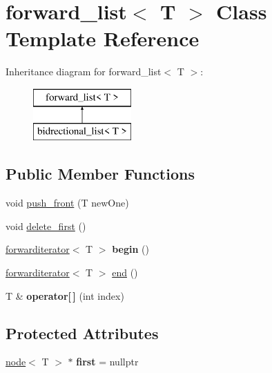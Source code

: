 \hypertarget{classforward__list}{}\section{forward\+\_\+list$<$ T $>$ Class Template Reference}
\label{classforward__list}
Inheritance diagram for forward\+\_\+list$<$ T $>$\+:\begin{figure}[H]
\begin{center}
\leavevmode
\includegraphics[height=2.000000cm]{classforward__list}
\end{center}
\end{figure}
\subsection*{Public Member Functions}
\begin{DoxyCompactItemize}
\item 
void \mbox{\hyperlink{classforward__list_a8d5eb5d0740e94215668417448d5aa05}{push\+\_\+front}} (T new\+One)
\item 
void \mbox{\hyperlink{classforward__list_a8280b378273f3146942cabd09ccfe34d}{delete\+\_\+first}} ()
\item 
\mbox{\label{classforward__list_a249a9fff14deb1b737c4088b41681f36}} 
\mbox{\hyperlink{classforwarditerator}{forwarditerator}}$<$ T $>$ {\bfseries begin} ()
\item 
\mbox{\hyperlink{classforwarditerator}{forwarditerator}}$<$ T $>$ \mbox{\hyperlink{classforward__list_a716064de94a50a5c3dbedccb351c9d68}{end}} ()
\item 
\mbox{\label{classforward__list_a593981941be500d718dc6d9feab4ae34}} 
T \& {\bfseries operator\mbox{[}$\,$\mbox{]}} (int index)
\end{DoxyCompactItemize}
\subsection*{Protected Attributes}
\begin{DoxyCompactItemize}
\item 
\mbox{\label{classforward__list_adeb3439d05db052c4946e10674b8b738}} 
\mbox{\hyperlink{classnode}{node}}$<$ T $>$ $\ast$ {\bfseries first} = nullptr
\end{DoxyCompactItemize}


